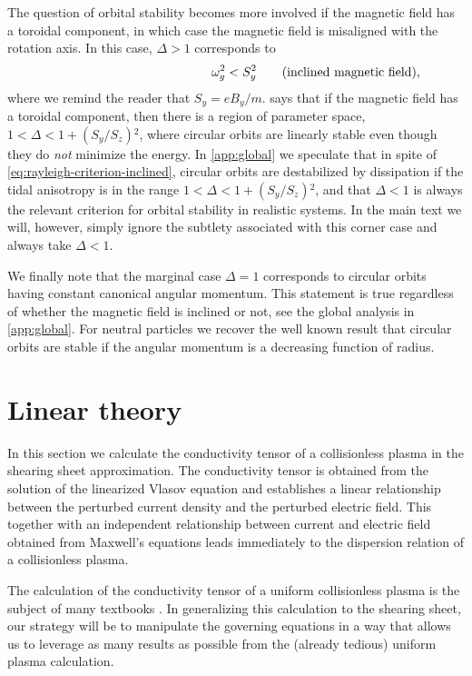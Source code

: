 \documentclass[aps,pre,notitlepage,amsmath,amssymb,amsfonts,nobibnotes,nofootinbib,superscriptaddress]{revtex4-1}
\begin{document}
The question of orbital stability becomes more involved if the magnetic field
has a toroidal component, in which case the magnetic field is misaligned with
the rotation axis. In this case, $\Delta>1$ corresponds to
\begin{equation}
  \label{eq:rayleigh-criterion-inclined}
  \phantom{\qquad(\textrm{inclined magnetic field})}
  \omg^2 < S_y^2
  \qquad(\textrm{inclined magnetic field}),
\end{equation}
where we remind the reader that $S_y=eB_y/m$.
 says that if the magnetic field has a
toroidal component, then there is a region of parameter space,
$1<\Delta<1+(S_y/S_z){}^2$, where circular orbits are linearly stable even
though they do \emph{not} minimize the energy. In \cref{app:global} we
speculate that in spite of \cref{eq:rayleigh-criterion-inclined}, circular
orbits are destabilized by dissipation if the tidal anisotropy is in the range
$1<\Delta<1+(S_y/S_z){}^2$, and that $\Delta<1$ is always the relevant
criterion for orbital stability in realistic systems. In the main text we
will, however, simply ignore the subtlety associated with this corner case and
always take $\Delta<1$.

We finally note that the marginal case $\Delta=1$ corresponds to circular
orbits having constant canonical angular momentum. This statement is true
regardless of whether the magnetic field is inclined or not, see the global
analysis in \cref{app:global}. For neutral particles we recover the well known
result that circular orbits are stable if the angular momentum is a decreasing
function of radius.

\section{Linear theory}
\label{sec:linear-theory}

In this section we calculate the conductivity tensor of a collisionless plasma
in the shearing sheet approximation. The conductivity tensor is obtained from
the solution of the linearized Vlasov equation and establishes a linear
relationship between the perturbed current density and the perturbed electric
field. This together with an independent relationship between current and
electric field obtained from Maxwell's equations leads immediately to the
dispersion relation of a collisionless plasma.

The calculation of the conductivity tensor of a uniform collisionless plasma
is the subject of many textbooks
\citep[e.g.][]{Krall1973,Ichimaru1973,Stix1992}. In generalizing this
calculation to the shearing sheet, our strategy will be to manipulate the
governing equations in a way that allows us to leverage as many results as
possible from the (already tedious) uniform plasma calculation.
\end{document}
